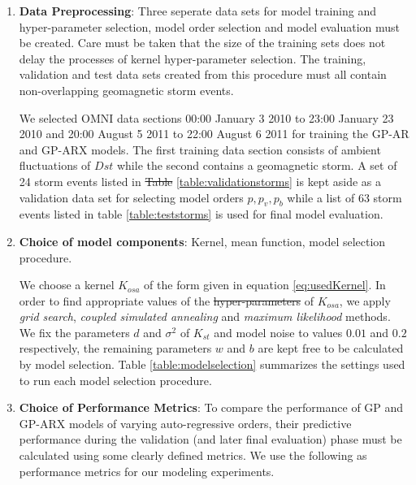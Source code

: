 \documentclass{article}
\providecommand{\DIFadd}[1]{{\protect\color{blue}\uwave{#1}}} %
\providecommand{\DIFdel}[1]{{\protect\color{red}\sout{#1}}}                      %
\providecommand{\DIFaddbegin}{} %
\providecommand{\DIFaddend}{} %
\providecommand{\DIFdelbegin}{} %
\providecommand{\DIFdelend}{} %
\newcommand{\DIFscaledelfig}{0.5}
\newlength{\DIFdelgraphicswidth} %
\newlength{\DIFdelgraphicsheight} %
\newcommand{\DIFaddincludegraphics}[2][]{{\color{blue}\fbox{\DIFOincludegraphics[#1]{#2}}}} %
\newcommand{\DIFdelincludegraphics}[2][]{%
\sbox{\DIFdelgraphicsbox}{\DIFOincludegraphics[#1]{#2}}%
\settoboxwidth{\DIFdelgraphicswidth}{\DIFdelgraphicsbox} %
\settoboxtotalheight{\DIFdelgraphicsheight}{\DIFdelgraphicsbox} %
\scalebox{\DIFscaledelfig}{%
\parbox[b]{\DIFdelgraphicswidth}{\usebox{\DIFdelgraphicsbox}\\[-\baselineskip] \rule{\DIFdelgraphicswidth}{0em}}\llap{\resizebox{\DIFdelgraphicswidth}{\DIFdelgraphicsheight}{%
\setlength{\unitlength}{\DIFdelgraphicswidth}%
\begin{picture}(1,1)%
\thicklines\linethickness{2pt} %
{\color[rgb]{1,0,0}\put(0,0){\framebox(1,1){}}}%
{\color[rgb]{1,0,0}\put(0,0){\line( 1,1){1}}}%
{\color[rgb]{1,0,0}\put(0,1){\line(1,-1){1}}}%
\end{picture}%
}\hspace*{3pt}}} %
} %
\DeclareRobustCommand{\DIFaddbegin}{\DIFOaddbegin \let\includegraphics\DIFaddincludegraphics} %
\DeclareRobustCommand{\DIFaddend}{\DIFOaddend \let\includegraphics\DIFOincludegraphics} %
\DeclareRobustCommand{\DIFdelbegin}{\DIFOdelbegin \let\includegraphics\DIFdelincludegraphics} %
\DeclareRobustCommand{\DIFdelend}{\DIFOaddend \let\includegraphics\DIFOincludegraphics} %
\begin{document}
\begin{enumerate}

\item \textbf{Data Preprocessing}: Three seperate data sets for model
  training and hyper-parameter selection, model order selection and
  model evaluation must be created. Care must be taken that the size
  of the training sets does not delay the processes of kernel
  hyper-parameter selection. The training, validation and test data
  sets created from this procedure must all contain non-overlapping
  geomagnetic storm events. 

  We selected OMNI data sections 00:00 January 3 2010 to 23:00 January
  23 2010 and 20:00 August 5 2011 to 22:00 August 6 2011 for training
  the GP-AR and GP-ARX models. The first training data section
  consists of ambient fluctuations of $Dst$ while the second contains
  a geomagnetic storm. A set of 24 storm events listed in \DIFdelbegin \DIFdel{Table }\DIFdelend \DIFaddbegin \DIFadd{table
  }\DIFaddend \ref{table:validationstorms} is kept aside as a validation data set
  for selecting model orders $p, p_v, p_b$ while a list of 63 storm
  events listed in table \ref{table:teststorms} is used for final
  model evaluation.


\item \textbf{Choice of model components}:  Kernel, mean function, model selection procedure. 

  We choose a kernel $K_{osa}$ of the form given in equation
  \ref{eq:usedKernel}. In order to find appropriate values of the
  \DIFdelbegin \DIFdel{hyper-parameters }\DIFdelend \DIFaddbegin \DIFadd{hyperparameters }\DIFaddend of $K_{osa}$, we apply \emph{grid search},
  \emph{coupled simulated annealing} and \emph{maximum likelihood}
  methods. We fix the parameters $d$ and $\sigma^2$ of $K_{st}$ and
  model noise to values $0.01$ and $0.2$ respectively, the remaining
  parameters $w$ and $b$ are kept free to be calculated by model
  selection. Table \ref{table:modelselection} summarizes the settings
  used to run each model selection procedure.

\item \textbf{Choice of Performance Metrics}: To compare the
  performance of GP and GP-ARX models of varying auto-regressive
  orders, their predictive performance during the validation (and
  later final evaluation) phase must be calculated using some clearly
  defined metrics. We use the following as performance metrics for our
  modeling experiments.


\end{enumerate}
\end{document}
